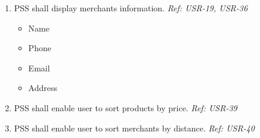 \begin{enumerate}[resume, label=SY-\arabic*]
    \item PSS shall display merchants information.
    \newline \textit{Ref: USR-19, USR-36}
    \begin{itemize}
        \item Name
        \item Phone 
        \item Email 
        \item Address
    \end{itemize}
    \item PSS shall enable user to sort products by price.
    \newline \textit{Ref: USR-39}
    \item PSS shall enable user to sort merchants by distance.
    \newline \textit{Ref: USR-40}
\end{enumerate}
\pagebreak
